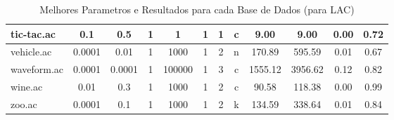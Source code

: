 \begin{table}[htbp]
\begin{tabular}{|l|c|c|c|c|c|c|c||c|c|c|c|}
		\hline
		tic-tac.ac     & 0.1      & 0.5         & 1              & 1                   & 1             & 1      & c             & 9.00           & 9.00           & 0.00           & 0.72           \\
		\hline
		vehicle.ac     & 0.0001   & 0.01        & 1              & 1000                & 1             & 2      & n             & 170.89         & 595.59         & 0.01           & 0.67           \\
		\hline
		waveform.ac    & 0.0001   & 0.0001      & 1              & 100000              & 1             & 3      & c             & 1555.12        & 3956.62        & 0.12           & 0.82           \\
		\hline
		wine.ac        & 0.01     & 0.3         & 1              & 1000                & 1             & 2      & c             & 90.58          & 118.38         & 0.00           & 0.99           \\
		\hline
		zoo.ac         & 0.0001   & 0.1         & 1              & 1000                & 1             & 2      & k             & 134.59         & 338.64         & 0.01           & 0.84           \\
		\hline
		\end{tabular}
	\caption{Melhores Parametros e Resultados para cada Base de Dados (para LAC)}
	\label{tab:best_runs_for_each_db_lac}
\end{table}